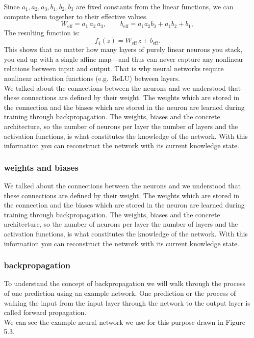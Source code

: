 \documentclass[a4paper,12pt]{report}
\begin{document}
Since \(a_1,a_2,a_3,b_1,b_2,b_3\) are fixed constants from the linear functions, we can compute them together to their effective values.
\begin{equation}
  W_{\mathrm{eff}} = a_1\,a_2\,a_3,
  \qquad
  b_{\mathrm{eff}} = a_1a_2b_3 + a_1b_2 + b_1,
\end{equation}
The resulting function is:
\begin{equation}
  f_4(z) = W_{\mathrm{eff}}\,z + b_{\mathrm{eff}}.
\end{equation}
This shows that no matter how many layers of purely linear neurons you stack, you end up with a single affine map—and thus can never capture any nonlinear relations between input and output.  That is why neural networks require nonlinear activation functions (e.g.\ ReLU) between layers. \\

We talked about the connections between the neurons and we understood that these connections are defined by their weight. The weights which are stored in the connection and the biases which are stored in the neuron are learned during training through backpropagation. The weights, biases and the concrete architecture, so the number of neurons per layer the number of layers and the activation functions, is what constitutes the knowledge of the network. With this information you can reconstruct the network with its current knowledge state. 
	\subsubsection{weights and biases}
	We talked about the connections between the neurons and we understood that these connections are defined by their weight. The weights which are stored in the connection and the biases which are stored in the neuron are learned during training through backpropagation. The weights, biases and the concrete architecture, so the number of neurons per layer the number of layers and the activation functions, is what constitutes the knowledge of the network. With this information you can reconstruct the network with its current knowledge state. 
	\subsubsection{backpropagation}
	To understand the concept of backpropagation we will walk through the process of one prediction using an example network. One prediction or the process of walking the input from the input layer through the network to the output layer is called forward propagation. \\
	We can see the example neural network we use for this purpose drawn in Figure 5.3.
	
\end{document}
